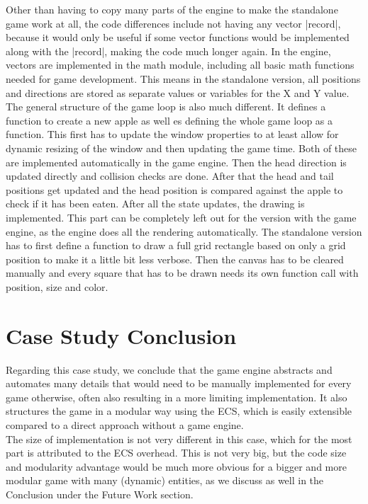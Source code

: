 Other than having to copy many parts of the engine to make the standalone game work at all, the code differences include not having any vector |record|, because it would only be useful if some vector functions would be implemented along with the |record|, making the code much longer again. In the engine, vectors are implemented in the math module, including all basic math functions needed for game development. This means in the standalone version, all positions and directions are stored as separate values or variables for the X and Y value.\\
The general structure of the game loop is also much different. It defines a function to create a new apple as well es defining the whole game loop as a function. This first has to update the window properties to at least allow for dynamic resizing of the window and then updating the game time. Both of these are implemented automatically in the game engine. Then the head direction is updated directly and collision checks are done. After that the head and tail positions get updated and the head position is compared against the apple to check if it has been eaten. After all the state updates, the drawing is implemented. This part can be completely left out for the version with the game engine, as the engine does all the rendering automatically. The standalone version has to first define a function to draw a full grid rectangle based on only a grid position to make it a little bit less verbose. Then the canvas has to be cleared manually and every square that has to be drawn needs its own function call with position, size and color.

\section{Case Study Conclusion}

Regarding this case study, we conclude that the game engine abstracts and automates many details that would need to be manually implemented for every game otherwise, often also resulting in a more limiting implementation. It also structures the game in a modular way using the ECS, which is easily extensible compared to a direct approach without a game engine.\\
The size of implementation is not very different in this case, which for the most part is attributed to the ECS overhead. This is not very big, but the code size and modularity advantage would be much more obvious for a bigger and more modular game with many (dynamic) entities, as we discuss as well in the Conclusion under the Future Work section.
